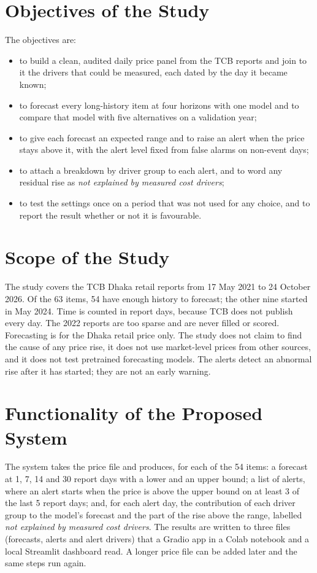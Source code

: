 \documentclass[12pt]{report}
\newcommand{\unexpl}{\emph{not explained by measured cost drivers}}
\begin{document}
\section{Objectives of the Study}
The objectives are:
\begin{itemize}
    \item to build a clean, audited daily price panel from the TCB reports and join to it the drivers that could be measured, each dated by the day it became known;
    \item to forecast every long-history item at four horizons with one model and to compare that model with five alternatives on a validation year;
    \item to give each forecast an expected range and to raise an alert when the price stays above it, with the alert level fixed from false alarms on non-event days;
    \item to attach a breakdown by driver group to each alert, and to word any residual rise as \unexpl;
    \item to test the settings once on a period that was not used for any choice, and to report the result whether or not it is favourable.
\end{itemize}

\section{Scope of the Study}
The study covers the TCB Dhaka retail reports from 17 May 2021 to 24 October 2026. Of the 63 items, 54 have enough history to forecast; the other nine started in May 2024. Time is counted in report days, because TCB does not publish every day. The 2022 reports are too sparse and are never filled or scored. Forecasting is for the Dhaka retail price only. The study does not claim to find the cause of any price rise, it does not use market-level prices from other sources, and it does not test pretrained forecasting models. The alerts detect an abnormal rise after it has started; they are not an early warning.

\section{Functionality of the Proposed System}
The system takes the price file and produces, for each of the 54 items: a forecast at 1, 7, 14 and 30 report days with a lower and an upper bound; a list of alerts, where an alert starts when the price is above the upper bound on at least 3 of the last 5 report days; and, for each alert day, the contribution of each driver group to the model's forecast and the part of the rise above the range, labelled \unexpl. The results are written to three files (forecasts, alerts and alert drivers) that a Gradio app in a Colab notebook and a local Streamlit dashboard read. A longer price file can be added later and the same steps run again.
\end{document}

